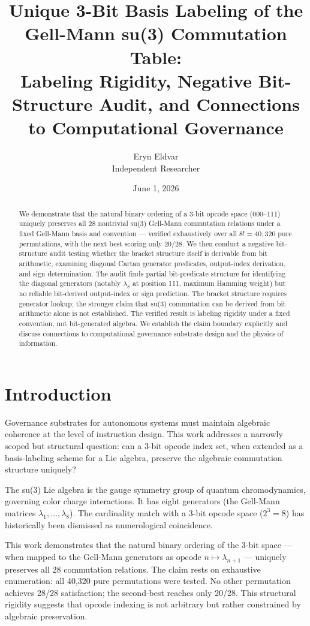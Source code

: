 \documentclass[11pt,a4paper]{article}
\title{Unique 3-Bit Basis Labeling of the Gell-Mann su(3) Commutation Table:\\
  Labeling Rigidity, Negative Bit-Structure Audit, and Connections to Computational Governance}
\author{Eryn Eldvar\\
  Independent Researcher}
\date{June 1, 2026}
\begin{document}
\maketitle

\begin{abstract}
We demonstrate that the natural binary ordering of a 3-bit opcode space (000--111) uniquely preserves all 28 nontrivial su(3) Gell-Mann commutation relations under a fixed Gell-Mann basis and convention --- verified exhaustively over all $8! = 40,320$ pure permutations, with the next best scoring only 20/28. We then conduct a negative bit-structure audit testing whether the bracket structure itself is derivable from bit arithmetic, examining diagonal Cartan generator predicates, output-index derivation, and sign determination. The audit finds partial bit-predicate structure for identifying the diagonal generators (notably $\lambda_8$ at position 111, maximum Hamming weight) but no reliable bit-derived output-index or sign prediction. The bracket structure requires generator lookup; the stronger claim that su(3) commutation can be derived from bit arithmetic alone is not established. The verified result is labeling rigidity under a fixed convention, not bit-generated algebra. We establish the claim boundary explicitly and discuss connections to computational governance substrate design and the physics of information.
\end{abstract}

\section{Introduction}

Governance substrates for autonomous systems must maintain algebraic coherence at the level of instruction design. This work addresses a narrowly scoped but structural question: can a 3-bit opcode index set, when extended as a basis-labeling scheme for a Lie algebra, preserve the algebraic commutation structure uniquely?

The su(3) Lie algebra is the gauge symmetry group of quantum chromodynamics, governing color charge interactions. It has eight generators (the Gell-Mann matrices $\lambda_1, \ldots, \lambda_8$). The cardinality match with a 3-bit opcode space ($2^3 = 8$) has historically been dismissed as numerological coincidence.

This work demonstrates that the natural binary ordering of the 3-bit space --- when mapped to the Gell-Mann generators as $\text{opcode } n \mapsto \lambda_{n+1}$ --- uniquely preserves all 28 commutation relations. The claim rests on exhaustive enumeration: all 40,320 pure permutations were tested. No other permutation achieves 28/28 satisfaction; the second-best reaches only 20/28. This structural rigidity suggests that opcode indexing is not arbitrary but rather constrained by algebraic preservation.
\end{document}
